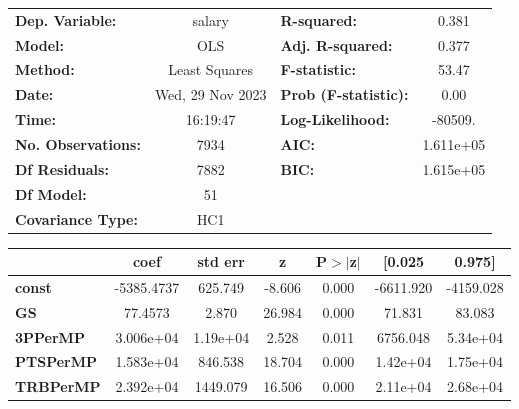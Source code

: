 \begin{center}
\begin{tabular}{lclc}
\toprule
\textbf{Dep. Variable:}       &      salary      & \textbf{  R-squared:         } &     0.381   \\
\textbf{Model:}               &       OLS        & \textbf{  Adj. R-squared:    } &     0.377   \\
\textbf{Method:}              &  Least Squares   & \textbf{  F-statistic:       } &     53.47   \\
\textbf{Date:}                & Wed, 29 Nov 2023 & \textbf{  Prob (F-statistic):} &     0.00    \\
\textbf{Time:}                &     16:19:47     & \textbf{  Log-Likelihood:    } &   -80509.   \\
\textbf{No. Observations:}    &        7934      & \textbf{  AIC:               } & 1.611e+05   \\
\textbf{Df Residuals:}        &        7882      & \textbf{  BIC:               } & 1.615e+05   \\
\textbf{Df Model:}            &          51      & \textbf{                     } &             \\
\textbf{Covariance Type:}     &       HC1        & \textbf{                     } &             \\
\bottomrule
\end{tabular}
\begin{tabular}{lcccccc}
                              & \textbf{coef} & \textbf{std err} & \textbf{z} & \textbf{P$> |$z$|$} & \textbf{[0.025} & \textbf{0.975]}  \\
\midrule
\textbf{const}                &   -5385.4737  &      625.749     &    -8.606  &         0.000        &    -6611.920    &    -4159.028     \\
\textbf{GS}                   &      77.4573  &        2.870     &    26.984  &         0.000        &       71.831    &       83.083     \\
\textbf{3PPerMP}              &    3.006e+04  &     1.19e+04     &     2.528  &         0.011        &     6756.048    &     5.34e+04     \\
\textbf{PTSPerMP}             &    1.583e+04  &      846.538     &    18.704  &         0.000        &     1.42e+04    &     1.75e+04     \\
\textbf{TRBPerMP}             &    2.392e+04  &     1449.079     &    16.506  &         0.000        &     2.11e+04    &     2.68e+04     \\

\end{tabular}
\end{center}
